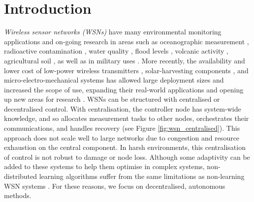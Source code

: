 \section{Introduction}

\textit{Wireless sensor networks (WSNs)} have many environmental monitoring applications and on-going research in areas such as oceanographic measurement \citep{Mahdy2008a, Albaladejo2010, 6973877}, radioactive contamination \citep{Gomez2015}, water quality \citep{Fang2010}, flood levels \citep{Castillo2004}, volcanic activity \citep{Werner-Allen2006}, agricultural soil \citep{8745854}, as well as in military uses \citep{6268958}. More recently, the availability and lower cost of low-power wireless transmitters \citep{902661}, solar-harvesting components \citep{Prauzek2018}, and micro-electro-mechanical systems \citep{1045391} has allowed large deployment sizes and increased the scope of use, expanding their real-world applications and opening up new areas for research \citep{5597912, Kandris2020}.
WSNs can be structured with centralised or decentralised control. With centralisation, the controller node has system-wide knowledge, and so allocates measurement tasks to other nodes, orchestrates their communications, and handles recovery (see Figure \ref{fig:wsn_centralised}). This approach does not scale well to large networks due to congestion and resource exhaustion on the central component. In harsh environments, this centralisation of control is not robust to damage or node loss. Although some adaptivity can be added to these systems to help them optimise in complex systems, non-distributed learning algorithms suffer from the same limitations as non-learning WSN systems \citep{Imagestate2006}. For these reasons, we focus on decentralised, autonomous methods.
